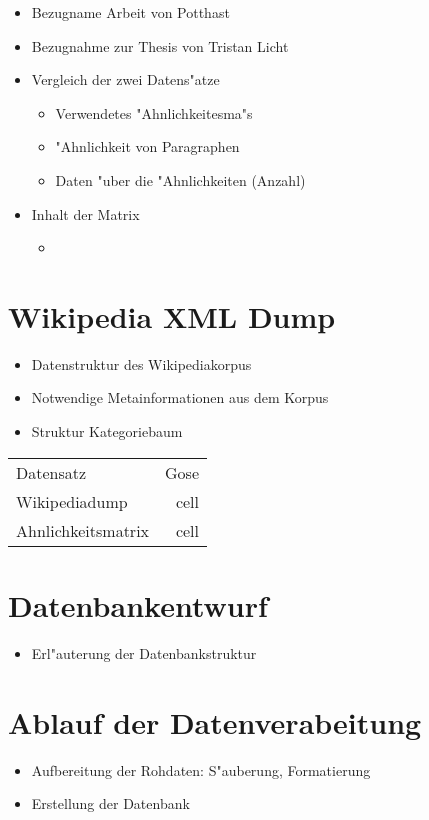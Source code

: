\begin{itemize}
    \item Bezugname Arbeit von Potthast
    \item Bezugnahme zur Thesis von Tristan Licht
    \item Vergleich der zwei Datens"atze

    \begin{itemize}
      \item Verwendetes "Ahnlichkeitesma"s
      \item "Ahnlichkeit von Paragraphen
      \item Daten "uber die "Ahnlichkeiten (Anzahl)
    \end{itemize}
    \item Inhalt der Matrix
    \begin{itemize}
      \item
    \end{itemize}
\end{itemize}



\section{Wikipedia XML Dump}
\begin{itemize}
    \item Datenstruktur des Wikipediakorpus
    \item Notwendige Metainformationen aus dem Korpus
    \item Struktur Kategoriebaum
\end{itemize}

\begin{center}
\begin{tabular}{l r}
  Datensatz & Gose \\
  Wikipediadump & cell \\
  Ahnlichkeitsmatrix & cell \\
\end{tabular}
\end{center}

\section{Datenbankentwurf}
\begin{itemize}
    \item Erl"auterung der Datenbankstruktur
\end{itemize}


\section{Ablauf der Datenverabeitung}
\begin{itemize}
    \item Aufbereitung der Rohdaten: S"auberung, Formatierung
    \item Erstellung der Datenbank
\end{itemize}
